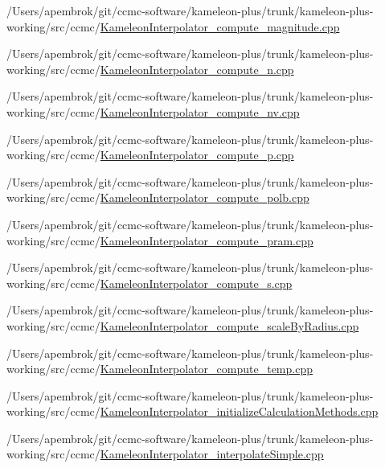 \begin{DoxyCompactItemize}
/\-Users/apembrok/git/ccmc-\/software/kameleon-\/plus/trunk/kameleon-\/plus-\/working/src/ccmc/\hyperlink{_kameleon_interpolator__compute__magnitude_8cpp}{Kameleon\-Interpolator\-\_\-compute\-\_\-magnitude.\-cpp}\item 
/\-Users/apembrok/git/ccmc-\/software/kameleon-\/plus/trunk/kameleon-\/plus-\/working/src/ccmc/\hyperlink{_kameleon_interpolator__compute__n_8cpp}{Kameleon\-Interpolator\-\_\-compute\-\_\-n.\-cpp}\item 
/\-Users/apembrok/git/ccmc-\/software/kameleon-\/plus/trunk/kameleon-\/plus-\/working/src/ccmc/\hyperlink{_kameleon_interpolator__compute__nv_8cpp}{Kameleon\-Interpolator\-\_\-compute\-\_\-nv.\-cpp}\item 
/\-Users/apembrok/git/ccmc-\/software/kameleon-\/plus/trunk/kameleon-\/plus-\/working/src/ccmc/\hyperlink{_kameleon_interpolator__compute__p_8cpp}{Kameleon\-Interpolator\-\_\-compute\-\_\-p.\-cpp}\item 
/\-Users/apembrok/git/ccmc-\/software/kameleon-\/plus/trunk/kameleon-\/plus-\/working/src/ccmc/\hyperlink{_kameleon_interpolator__compute__polb_8cpp}{Kameleon\-Interpolator\-\_\-compute\-\_\-polb.\-cpp}\item 
/\-Users/apembrok/git/ccmc-\/software/kameleon-\/plus/trunk/kameleon-\/plus-\/working/src/ccmc/\hyperlink{_kameleon_interpolator__compute__pram_8cpp}{Kameleon\-Interpolator\-\_\-compute\-\_\-pram.\-cpp}\item 
/\-Users/apembrok/git/ccmc-\/software/kameleon-\/plus/trunk/kameleon-\/plus-\/working/src/ccmc/\hyperlink{_kameleon_interpolator__compute__s_8cpp}{Kameleon\-Interpolator\-\_\-compute\-\_\-s.\-cpp}\item 
/\-Users/apembrok/git/ccmc-\/software/kameleon-\/plus/trunk/kameleon-\/plus-\/working/src/ccmc/\hyperlink{_kameleon_interpolator__compute__scale_by_radius_8cpp}{Kameleon\-Interpolator\-\_\-compute\-\_\-scale\-By\-Radius.\-cpp}\item 
/\-Users/apembrok/git/ccmc-\/software/kameleon-\/plus/trunk/kameleon-\/plus-\/working/src/ccmc/\hyperlink{_kameleon_interpolator__compute__temp_8cpp}{Kameleon\-Interpolator\-\_\-compute\-\_\-temp.\-cpp}\item 
/\-Users/apembrok/git/ccmc-\/software/kameleon-\/plus/trunk/kameleon-\/plus-\/working/src/ccmc/\hyperlink{_kameleon_interpolator__initialize_calculation_methods_8cpp}{Kameleon\-Interpolator\-\_\-initialize\-Calculation\-Methods.\-cpp}\item 
/\-Users/apembrok/git/ccmc-\/software/kameleon-\/plus/trunk/kameleon-\/plus-\/working/src/ccmc/\hyperlink{_kameleon_interpolator__interpolate_simple_8cpp}{Kameleon\-Interpolator\-\_\-interpolate\-Simple.\-cpp}\end{DoxyCompactItemize}

